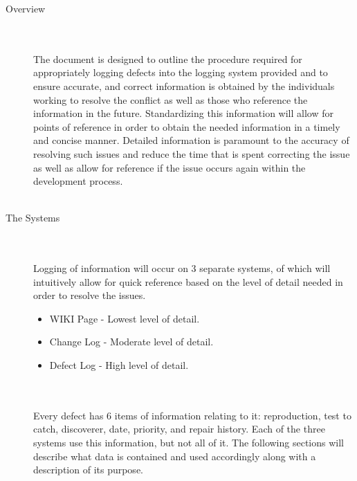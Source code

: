 \documentclass[11pt, letterpaper]{report}
\begin{document}
\begin{description}

\item[\Large{Overview}] \hfill \\ \hfill \\
The document is designed to outline the procedure required for appropriately logging defects into the logging system provided and to ensure accurate, and correct information is obtained by the individuals working to resolve the conflict as well as those who reference the information in the future.  Standardizing this information will allow for points of reference in order to obtain the needed information in a timely and concise manner.  Detailed information is paramount to the accuracy of resolving such issues and reduce the time that is spent correcting the issue as well as allow for reference if the issue occurs again within the development process. \hfill \\ \hfill \\
\item[\Large{The Systems}] \hfill \\ \hfill \\
Logging of information will occur on 3 separate systems, of which will intuitively allow for quick reference based on the level of detail needed in order to resolve the issues. \hfill \\

\begin{itemize}
	\item WIKI Page - Lowest level of detail.
	\item Change Log - Moderate level of detail.
	\item Defect Log - High level of detail.
\end{itemize} \hfill \\ \hfill \\

Every defect has 6 items of information relating to it: reproduction, test to catch, discoverer, date, priority, and repair history.  Each of the three systems use this information, but not all of it.  The following sections will describe what data is contained and used accordingly along with a description of its purpose.


\end{description}
\end{document}
